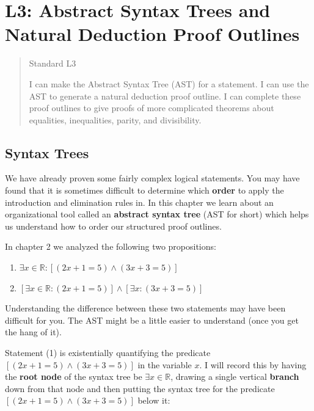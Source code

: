 \chapter{L3:  Abstract Syntax Trees and Natural Deduction Proof Outlines}

\begin{quote}
	\begin{center}
	Standard L3
	\end{center}
	\medskip 
	
	I can make the Abstract Syntax Tree (AST) for a statement.  I can use the AST to generate a natural deduction proof outline.  I can complete these proof outlines to give proofs of more complicated theorems about equalities, inequalities, parity, and divisibility.  
	\end{quote}
\section{Syntax Trees}

We have already proven some fairly complex logical statements.  You may have found that it is sometimes difficult to determine which \textbf{order} to apply the introduction and elimination rules in.  In this chapter we learn about an organizational tool called an \textbf{abstract syntax tree} (AST for short) which helps us understand how to order our structured proof outlines. 

In  chapter 2  we analyzed the following two propositions:

\begin{enumerate}
	\item $\exists x \in \mathbb{R}: [(2x+1 = 5) \wedge (3x+3 = 5)]$
	
	\item $[\exists x \in \mathbb{R}: (2x+1 = 5)] \wedge [\exists x: (3x+3 = 5)]$
\end{enumerate}

Understanding the difference between these two statements may have been difficult for you.  The AST  might be a little easier to understand (once you get the hang of it).

Statement (1) is existentially quantifying the predicate $[(2x+1 = 5) \wedge (3x+3 = 5)]$ in the variable $x$.  I will record this by having the \textbf{root node} of the syntax tree be $\exists x \in \mathbb{R}$, drawing a single vertical \textbf{branch} down from that node and then putting the syntax tree for the predicate $[(2x+1 = 5) \wedge (3x+3 = 5)]$ below it:


